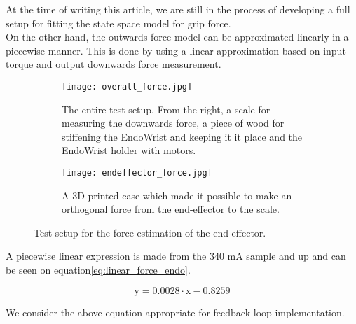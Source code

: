 


At the time of writing this article, we are still in the process of developing a full setup for fitting the state space model for grip force.\\

On the other hand, the outwards force model can be approximated linearly in a piecewise manner.
This is done by using a linear approximation based on input torque and output downwards force measurement.


\begin{figure}
  \centering
  \begin{subfigure}{.45\linewidth}
  \vspace{30pt}
    \centering
    \texttt{[image: overall\_force.jpg]}
    \caption{The entire test setup. From the right, a scale for measuring the downwards force, a piece of wood for stiffening the EndoWrist and keeping it it place and the EndoWrist holder with motors.}
    \label{fig:entire_force_testsetup}
  \end{subfigure}
  \begin{subfigure}{.45\linewidth}
    \centering
    \texttt{[image: endeffector\_force.jpg]}
    \caption{A 3D printed case which made it possible to make an orthogonal force from the end-effector to the scale.}
    \label{fig:endeffector_force}
  \end{subfigure}
\caption{Test setup for the force estimation of the end-effector.}
\label{fig:Overview_force}
\end{figure}


A piecewise linear expression is made from the 340 mA sample and up and can be seen on equation\eqref{eq:linear_force_endo}.


\begin{equation}
\text{y} = 0.0028 \cdot \text{x} -0.8259
\label{eq:linear_force_endo}
\end{equation}


We consider the above equation appropriate for feedback loop implementation.
